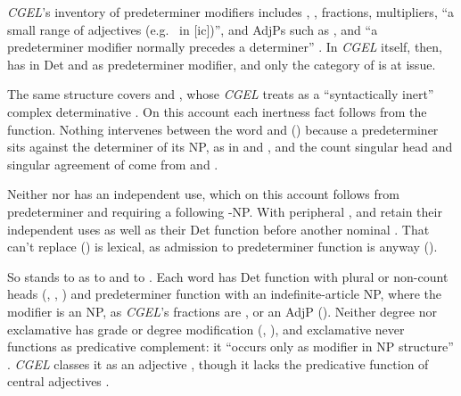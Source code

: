 \documentclass[12pt]{article}
\begin{document}
\textit{CGEL}'s inventory of predeterminer modifiers includes , , fractions, multipliers, \enquote{a small range of adjectives (e.g.\  in [ic])}, and AdjPs such as , and \enquote{a predeterminer modifier normally precedes a determiner} \citep[331]{huddleston2002}. In \textit{CGEL} itself, then,  has  in Det and  as predeterminer modifier, and only the category of  is at issue.

The same structure covers  and , whose  \textit{CGEL} treats as a \enquote{syntactically inert} complex determinative \citep[394]{huddleston2002}. On this account each inertness fact follows from the function. Nothing intervenes between the word and  () because a predeterminer sits against the determiner of its NP, as in  and , and the count singular head and singular agreement of  come from  and .

Neither  nor  has an independent use, which on this account follows from predeterminer  and  requiring a following -NP. With peripheral ,  and  retain their independent uses as well as their Det function before another nominal \citep[392, 394]{huddleston2002}. That  can't replace  () is lexical, as admission to predeterminer function is anyway ().

So  stands to  as  to  and  to . Each word has Det function with plural or non-count heads (, , ) and predeterminer function with an indefinite-article NP, where the modifier is an NP, as \textit{CGEL}'s fractions are \citep[385 n.~25]{huddleston2002}, or an AdjP (). Neither degree  nor exclamative  has grade or degree modification (, ), and exclamative  never functions as predicative complement: it \enquote{occurs only as modifier in NP structure} \citep[920]{huddleston2002}. \textit{CGEL} classes it as an adjective \citep[540]{huddleston2002}, though it lacks the predicative function of central adjectives \citep[528]{huddleston2002}.
\end{document}
